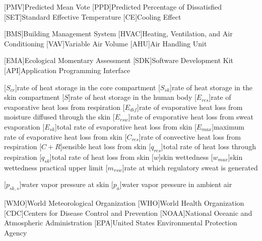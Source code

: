 \begin{acronym}[longest]
    [PMV]{Predicted Mean Vote}
    [PPD]{Predicted Percentage of Dissatisfied\acroextra{, \%}}
    [SET]{Standard Effective Temperature}
    [CE]{Cooling Effect}

    [BMS]{Building Management System}
    [HVAC]{Heating, Ventilation, and Air Conditioning}
    [VAV]{Variable Air Volume}
    [AHU]{Air Handling Unit}

    [EMA]{Ecological Momentary Assessment}
    [SDK]{Software Development Kit}
    [API]{Application Programming Interface}

    [$S_{cr}$]{rate of heat storage in the core compartment}
    [$S_{sk}$]{rate of heat storage in the skin compartment}
    [$S$]{rate of heat storage in the human body}
    [$E_{res}$]{rate of evaporative heat loss from respiration}
    [$E_{dif}$]{rate of evaporative heat loss from moisture diffused through the skin}
    [$E_{rsw}$]{rate of evaporative heat loss from sweat evaporation}
    [$E_{sk}$]{total rate of evaporative heat loss from skin}
    [$E_{max}$]{maximum rate of evaporative heat loss from skin}
    [$C_{res}$]{rate of convective heat loss from respiration}
    [$C + R$]{sensible heat loss from skin}
    [$q_{res}$]{total rate of heat loss through respiration}
    [$q_{sk}$]{total rate of heat loss from skin}
    [$w$]{skin wettedness}
    [$w_{max}$]{skin wettedness practical upper limit}
    [$m_{rsw}$]{rate at which regulatory sweat is generated} %

    [$p_{sk,s}$]{water vapor pressure at skin}
    [$p_{a}$]{water vapor pressure in ambient air}

    [WMO]{World Meteorological Organization}
    [WHO]{World Health Organization}
    [CDC]{Centers for Disease Control and Prevention}
    [NOAA]{National Oceanic and Atmospheric Administration}
    [EPA]{United States Environmental Protection Agency}

\end{acronym}
\renewcommand{\baselinestretch}{1}\normalsize
